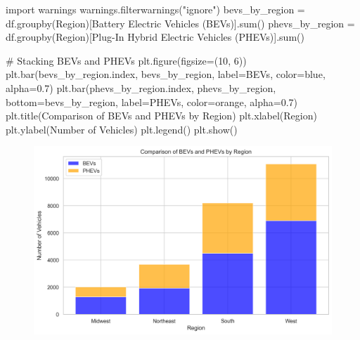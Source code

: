 \documentclass[
  letterpaper,
  DIV=11,
  numbers=noendperiod]{scrartcl}
\newenvironment{Shaded}{\begin{snugshade}}{\end{snugshade}}
\newcommand{\BuiltInTok}[1]{\textcolor[rgb]{0.00,0.23,0.31}{#1}}
\newcommand{\CommentTok}[1]{\textcolor[rgb]{0.37,0.37,0.37}{#1}}
\newcommand{\DecValTok}[1]{\textcolor[rgb]{0.68,0.00,0.00}{#1}}
\newcommand{\FloatTok}[1]{\textcolor[rgb]{0.68,0.00,0.00}{#1}}
\newcommand{\ImportTok}[1]{\textcolor[rgb]{0.00,0.46,0.62}{#1}}
\newcommand{\NormalTok}[1]{\textcolor[rgb]{0.00,0.23,0.31}{#1}}
\newcommand{\OperatorTok}[1]{\textcolor[rgb]{0.37,0.37,0.37}{#1}}
\newcommand{\StringTok}[1]{\textcolor[rgb]{0.13,0.47,0.30}{#1}}
\begin{document}
\begin{Shaded}
\begin{Highlighting}[]
\ImportTok{import}\NormalTok{ warnings}
\NormalTok{warnings.filterwarnings(}\StringTok{"ignore"}\NormalTok{)}
\NormalTok{bevs\_by\_region }\OperatorTok{=}\NormalTok{ df.groupby(}\StringTok{\textquotesingle{}Region\textquotesingle{}}\NormalTok{)[}\StringTok{\textquotesingle{}Battery Electric Vehicles (BEVs)\textquotesingle{}}\NormalTok{].}\BuiltInTok{sum}\NormalTok{()}
\NormalTok{phevs\_by\_region }\OperatorTok{=}\NormalTok{ df.groupby(}\StringTok{\textquotesingle{}Region\textquotesingle{}}\NormalTok{)[}\StringTok{\textquotesingle{}Plug{-}In Hybrid Electric Vehicles (PHEVs)\textquotesingle{}}\NormalTok{].}\BuiltInTok{sum}\NormalTok{()}

\CommentTok{\# Stacking BEVs and PHEVs}
\NormalTok{plt.figure(figsize}\OperatorTok{=}\NormalTok{(}\DecValTok{10}\NormalTok{, }\DecValTok{6}\NormalTok{))}
\NormalTok{plt.bar(bevs\_by\_region.index, bevs\_by\_region, label}\OperatorTok{=}\StringTok{\textquotesingle{}BEVs\textquotesingle{}}\NormalTok{, color}\OperatorTok{=}\StringTok{\textquotesingle{}blue\textquotesingle{}}\NormalTok{, alpha}\OperatorTok{=}\FloatTok{0.7}\NormalTok{)}
\NormalTok{plt.bar(phevs\_by\_region.index, phevs\_by\_region, bottom}\OperatorTok{=}\NormalTok{bevs\_by\_region, label}\OperatorTok{=}\StringTok{\textquotesingle{}PHEVs\textquotesingle{}}\NormalTok{, color}\OperatorTok{=}\StringTok{\textquotesingle{}orange\textquotesingle{}}\NormalTok{, alpha}\OperatorTok{=}\FloatTok{0.7}\NormalTok{)}
\NormalTok{plt.title(}\StringTok{\textquotesingle{}Comparison of BEVs and PHEVs by Region\textquotesingle{}}\NormalTok{)}
\NormalTok{plt.xlabel(}\StringTok{\textquotesingle{}Region\textquotesingle{}}\NormalTok{)}
\NormalTok{plt.ylabel(}\StringTok{\textquotesingle{}Number of Vehicles\textquotesingle{}}\NormalTok{)}
\NormalTok{plt.legend()}
\NormalTok{plt.show()}
\end{Highlighting}
\end{Shaded}

\begin{figure}[H]

{\centering \includegraphics{SummaryPaper_FinalProject_T1_files/figure-pdf/cell-17-output-1.png}

}

\end{figure}
\end{document}

